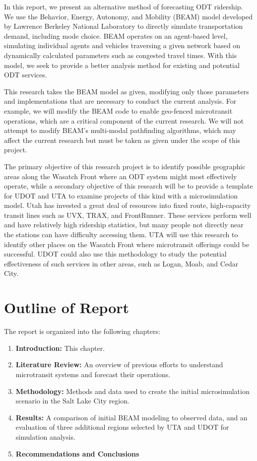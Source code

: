 \documentclass[
]{report}
\providecommand{\tightlist}{%
  \setlength{\itemsep}{0pt}\setlength{\parskip}{0pt}}
\begin{document}
In this report, we present an alternative method of forecasting ODT ridership. We use the Behavior, Energy, Autonomy, and Mobility (BEAM) model developed by Lawrence Berkeley National Laboratory to directly simulate transportation demand, including mode choice. BEAM operates on an agent-based level, simulating individual agents and vehicles traversing a given network based on dynamically calculated parameters such as congested travel times. With this model, we seek to provide a better analysis method for existing and potential ODT services.

This research takes the BEAM model as given, modifying only those parameters and implementations that are necessary to conduct the current analysis. For example, we will modify the BEAM code to enable geo-fenced microtransit operations, which are a critical component of the current research. We will not attempt to modify BEAM's multi-modal pathfinding algorithms, which may affect the current research but must be taken as given under the scope of this project.

The primary objective of this research project is to identify possible geographic areas along the Wasatch Front where an ODT system might most effectively operate, while a secondary objective of this research will be to provide a template for UDOT and UTA to examine projects of this kind with a microsimulation model. Utah has invested a great deal of resources into fixed route, high-capacity transit lines such as UVX, TRAX, and FrontRunner. These services perform well and have relatively high ridership statistics, but many people not directly near the stations can have difficulty accessing them. UTA will use this research to identify other places on the Wasatch Front where microtransit offerings could be successful. UDOT could also use this methodology to study the potential effectiveness of such services in other areas, such as Logan, Moab, and Cedar City.

\hypertarget{outline-of-report}{%
\section{Outline of Report}\label{outline-of-report}}

The report is organized into the following chapters:

\begin{enumerate}
\def\labelenumi{\arabic{enumi}.}
\tightlist
\item
  \textbf{Introduction:} This chapter.
\item
  \textbf{Literature Review:} An overview of previous efforts to understand microtransit systems and forecast their operations.
\item
  \textbf{Methodology:} Methods and data used to create the initial microsimulation scenario in the Salt Lake City region.
\item
  \textbf{Results:} A comparison of initial BEAM modeling to observed data, and an evaluation of three additional regions selected by UTA and UDOT for simulation analysis.
\item
  \textbf{Recommendations and Conclusions}
\end{enumerate}
\end{document}
